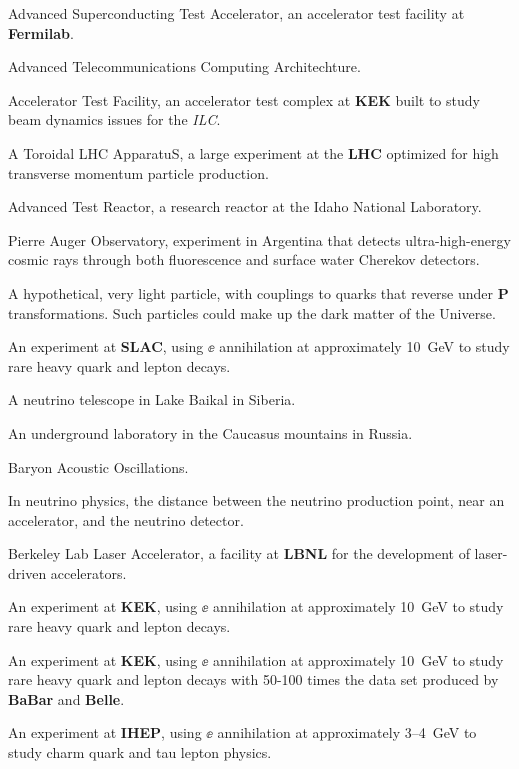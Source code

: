   Advanced Superconducting Test Accelerator, an 
      accelerator test facility at {\bf Fermilab}.

  Advanced Telecommunications Computing Architechture.

  Accelerator Test Facility, an accelerator test
complex
 at {\bf KEK} built to study beam dynamics issues for the {\it ILC}. 

  A Toroidal LHC ApparatuS, a large experiment at the 
{\bf LHC} optimized for high transverse momentum 
particle production.

 Advanced Test Reactor, a research reactor at the Idaho National Laboratory.

  Pierre Auger Observatory, experiment in Argentina that detects
ultra-high-energy cosmic rays through both fluorescence and surface
water Cherekov detectors.

 A hypothetical, very light particle, with
couplings to quarks that reverse under {\bf P} transformations.  Such
particles could make up the dark matter of the Universe.

  An experiment at {\bf SLAC}, using $\ee$ annihilation at
approximately 10~GeV to study rare heavy quark and lepton decays. 

 A neutrino telescope in Lake Baikal in Siberia.

 An underground laboratory in the Caucasus mountains in
Russia.

  Baryon Acoustic Oscillations.

   In neutrino physics, the distance between the
 neutrino production point, near an accelerator, and the neutrino
 detector.

 Berkeley Lab Laser Accelerator, a facility at {\bf
  LBNL} for  the development of laser-driven accelerators.

  An experiment at {\bf KEK}, using $\ee$ annihilation at
approximately 10~GeV to study rare heavy quark and lepton decays. 

  An experiment at {\bf KEK}, using $\ee$ annihilation at
approximately 10~GeV to study rare heavy quark and lepton decays with 
50-100 times the  data set produced by {\bf BaBar} and {\bf Belle}. 

  An experiment at {\bf IHEP}, using $\ee$ annihilation at
approximately 3--4~GeV to study charm quark and tau lepton physics. 

